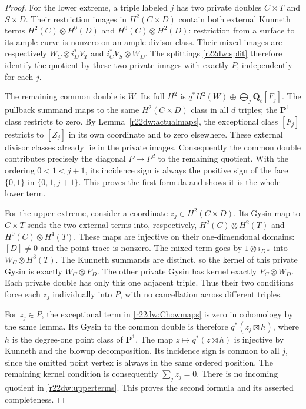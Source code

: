 \begin{proof}
For the lower extreme, a triple labeled $j$ has two private
doubles $C\times T$ and $S\times D$.  Their restriction images
in $H^2(C\times D)$ contain both external Kunneth terms
$H^2(C)\otimes H^0(D)$ and $H^0(C)\otimes H^2(D)$: restriction
from a surface to its ample curve is nonzero on an ample divisor
class.  Their mixed images are respectively
$W_C\otimes i_D^*V_T$ and $i_C^*V_S\otimes W_D$.
The splittings \eqref{r22dw:split} therefore identify the quotient
by these two private images with exactly $P$, independently for
each $j$.

The remaining common double is $\widetilde W$.
Its full $H^2$ is $q^*H^2(W)\oplus\bigoplus_j\mathbf Q_\ell[F_j]$.
The pullback summand maps to the same $H^2(C\times D)$ class in
all $d$ triples; the $\mathbf P^1$ class restricts to zero.  By
Lemma~\ref{r22dw:actualmaps}, the exceptional class $[F_j]$
restricts to $[Z_j]$ in its own coordinate and to zero elsewhere.
These external divisor classes already lie in the private images.
Consequently the common double contributes precisely the diagonal
$P\to P^d$ to the remaining quotient.  With the ordering
$0<1<j+1$, its incidence sign is always the positive sign of
the face $\{0,1\}$ in $\{0,1,j+1\}$.  This proves the first
formula and shows it is the whole lower term.

For the upper extreme, consider a coordinate
$z_j\in H^2(C\times D)$.  Its Gysin map to $C\times T$ sends
the two external terms into, respectively,
$H^2(C)\otimes H^2(T)$ and $H^0(C)\otimes H^4(T)$.
These maps are injective on their one-dimensional domains:
$[D]\ne0$ and the point trace is nonzero.  The mixed term goes
by $1\otimes i_{D*}$ into $W_C\otimes H^3(T)$.
The Kunneth summands are distinct, so the kernel of this private
Gysin is exactly $W_C\otimes P_D$.  The other private Gysin
has kernel exactly $P_C\otimes W_D$.  Each private double has
only this one adjacent triple.  Thus their two conditions force
each $z_j$ individually into $P$, with no cancellation across
different triples.

For $z_j\in P$, the exceptional term in
\eqref{r22dw:Chowmaps} is zero in cohomology by the same lemma.
Its Gysin to the common double is therefore
$q^*(z_j\boxtimes h)$, where $h$ is the degree-one point class
of $\mathbf P^1$.  The map $z\mapsto q^*(z\boxtimes h)$ is
injective by Kunneth and the blowup decomposition.  Its incidence
sign is common to all $j$, since the omitted point vertex is
always in the same ordered position.  The remaining kernel
condition is consequently $\sum_j z_j=0$.  There is no incoming
quotient in \eqref{r22dw:upperterms}.  This proves the second
formula and its asserted completeness.
\end{proof}


